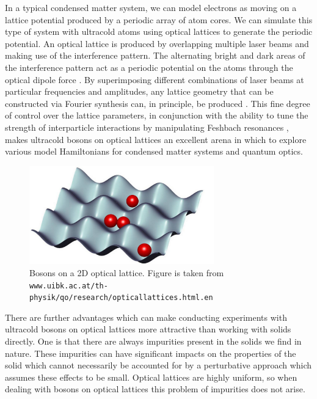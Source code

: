 \documentclass[a4paper, 10pt, draft]{article}
\theoremstyle{plain}
\begin{document}
In a typical condensed matter system, we can model electrons as moving on a
lattice potential produced by a periodic array of atom cores. We can simulate
this type of system with ultracold atoms using optical lattices to generate the
periodic potential. An optical lattice is produced by overlapping multiple laser
beams and making use of the interference pattern. The alternating bright and
dark areas of the interference pattern act as a periodic potential on the atoms
through the optical dipole force \cite{Bloch2012}. By superimposing different
combinations of laser beams at particular frequencies and amplitudes, any
lattice geometry that can be constructed via Fourier synthesis can, in
principle, be produced \cite{Bloch2012}. This fine degree of control over the
lattice parameters, in conjunction with the ability to tune the strength of
interparticle interactions by manipulating Feshbach resonances \cite{Chin2010},
makes ultracold bosons on optical lattices an excellent arena in which to
explore various model Hamiltonians for condensed matter systems and quantum
optics.
\begin{figure}[bh!]
    \begin{center}
        \includegraphics[width=8cm]{bosons_on_lattice}
    \end{center}
    \caption{Bosons on a 2D optical lattice. Figure is taken from\newline
             \texttt{www.uibk.ac.at/th-physik/qo/research/opticallattices.html.en}
            }
\end{figure}
There are further advantages which can make conducting experiments with
ultracold bosons on optical lattices more attractive than working with solids
directly. One is that there are always impurities present in the solids we find
in nature. These impurities can have significant impacts on the properties of
the solid which cannot necessarily be accounted for by a perturbative approach
which assumes these effects to be small. Optical lattices are highly uniform, so when
dealing with bosons on optical lattices this problem of impurities does not
arise.
\end{document}
